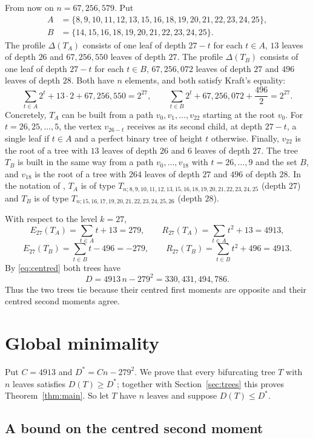\documentclass[11pt]{amsart}
\theoremstyle{remark}
\begin{document}
From now on $n=67{,}256{,}579$.
Put
\begin{align*}
A&=\{8,9,10,11,12,13,15,16,18,19,20,21,22,23,24,25\},\\
B&=\{14,15,16,18,19,20,21,22,23,24,25\}.
\end{align*}
The profile $\Delta(T_A)$ consists of one leaf of depth $27-t$ for each $t\in A$, $13$ leaves of depth $26$ and $67{,}256{,}550$ leaves of depth $27$.
The profile $\Delta(T_B)$ consists of one leaf of depth $27-t$ for each $t\in B$, $67{,}256{,}072$ leaves of depth $27$ and $496$ leaves of depth $28$.
Both have $n$ elements, and both satisfy Kraft's equality:
\[
\sum_{t\in A}2^{t}+13\cdot 2+67{,}256{,}550=2^{27},\qquad
\sum_{t\in B}2^{t}+67{,}256{,}072+\frac{496}{2}=2^{27}.
\]
Concretely, $T_A$ can be built from a path $v_0,v_1,\dots,v_{22}$ starting at the root $v_0$.
For $t=26,25,\dots,5$, the vertex $v_{26-t}$ receives as its second child, at depth $27-t$, a single leaf if $t\in A$ and a perfect binary tree of height $t$ otherwise.
Finally, $v_{22}$ is the root of a tree with $13$ leaves of depth $26$ and $6$ leaves of depth $27$.
The tree $T_B$ is built in the same way from a path $v_0,\dots,v_{18}$ with $t=26,\dots,9$ and the set $B$, and $v_{18}$ is the root of a tree with $264$ leaves of depth $27$ and $496$ of depth $28$.
In the notation of \cite{CMRR}, $T_A$ is of type $T_{n;8,9,10,11,12,13,15,16,18,19,20,21,22,23,24,25}$ (depth $27$) and $T_B$ is of type $T_{n;15,16,17,19,20,21,22,23,24,25,26}$ (depth $28$).

With respect to the level $k=27$,
\[
E_{27}(T_A)=\sum_{t\in A}t+13=279,\qquad R_{27}(T_A)=\sum_{t\in A}t^2+13=4913,
\]
\[
E_{27}(T_B)=\sum_{t\in B}t-496=-279,\qquad R_{27}(T_B)=\sum_{t\in B}t^2+496=4913 .
\]
By \eqref{eq:centred} both trees have
\[
D=4913\,n-279^2=330{,}431{,}494{,}786 .
\]
Thus the two trees tie because their centred first moments are opposite and their centred second moments agree.

\section{Global minimality}\label{sec:proof}

Put $C=4913$ and $D^*=Cn-279^2$.
We prove that every bifurcating tree $T$ with $n$ leaves satisfies $D(T)\ge D^*$; together with Section~\ref{sec:trees} this proves Theorem~\ref{thm:main}.
So let $T$ have $n$ leaves and suppose $D(T)\le D^*$.

\subsection{A bound on the centred second moment}
\end{document}
